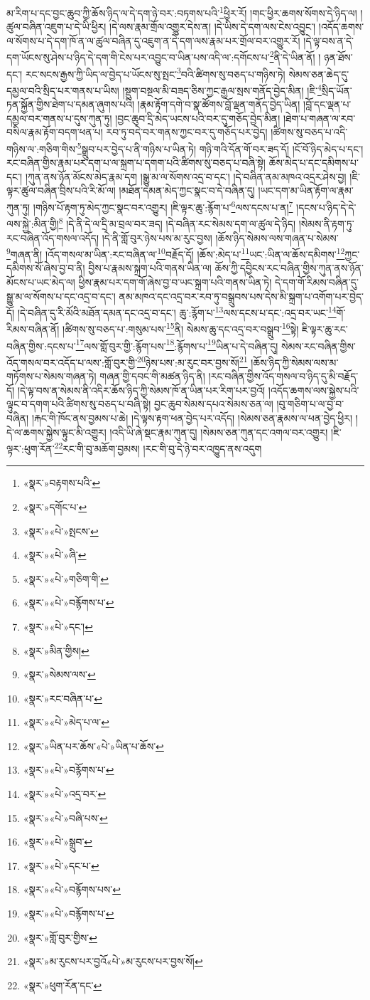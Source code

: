 མ་རིག་པ་དང་བྱང་ཆུབ་ཀྱི་ཆོས་ཉིད་ལ་དེ་དག་ཉེ་བར་:བཏགས་པའི་\footnote{«སྣར་»བརྟགས་པའི་}ཕྱིར་རོ། །གང་ཕྱིར་ཆགས་སོགས་དེ་ཉིད་ལ། །ཚུལ་བཞིན་འཇུག་པ་དེ་ཡི་ཕྱིར། །དེ་ལས་རྣམ་གྲོལ་འགྱུར་དེས་ན། །དེ་ཡིས་དེ་དག་ལས་ངེས་འབྱུང་། །འདོད་ཆགས་ལ་སོགས་པ་དེ་དག་ཁོ་ན་ལ་ཚུལ་བཞིན་དུ་འཇུག་ན་དེ་དག་ལས་རྣམ་པར་གྲོལ་བར་འགྱུར་རོ། །དེ་ལྟ་བས་ན་དེ་དག་ཡོངས་སུ་ཤེས་པ་ཉིད་དེ་དག་གི་ངེས་པར་འབྱུང་བ་ཡིན་པས་འདི་ལ་:དགོངས་པ་\footnote{«སྣར་»དགོང་པ་}ནི་དེ་ཡིན་ནོ། །
ཉན་ཐོས་དང་། རང་སངས་རྒྱས་ཀྱི་ཡིད་ལ་བྱེད་པ་ཡོངས་སུ་སྤང་\footnote{«སྣར་»«པེ་»སྤངས་}བའི་ཚིགས་སུ་བཅད་པ་གཉིས་ཏེ། སེམས་ཅན་ཆེད་དུ་དམྱལ་བའི་སྲིད་པར་གནས་པ་ཡིས། །སྡུག་བསྔལ་མི་བཟད་ཅིས་ཀྱང་རྒྱལ་སྲས་གནོད་བྱེད་མིན། །ཇི་\footnote{«སྣར་»«པེ་»ཞི་}སྲིད་ཡོན་ཏན་སྐྱོན་གྱིས་ཐེག་པ་དམན་ཞུགས་པའི། །རྣམ་རྟོག་དགེ་བ་སྣ་ཚོགས་བློ་ལྡན་གནོད་བྱེད་ཡིན། །བློ་དང་ལྡན་པ་དམྱལ་བར་གནས་པ་དུས་ཀུན་ཏུ། །བྱང་ཆུབ་དྲི་མེད་ཡངས་པའི་བར་དུ་གཅོད་བྱེད་མིན། །ཐེག་པ་གཞན་ལ་རབ་བསིལ་རྣམ་རྟོག་བདག་ཕན་པ། རབ་ཏུ་བདེ་བར་གནས་ཀྱང་བར་དུ་གཅོད་པར་བྱེད། །ཚིགས་སུ་བཅད་པ་འདི་གཉིས་ལ་:གཅིག་གིས་\footnote{«སྣར་»«པེ་»གཅིག་གི་}སྒྲུབ་པར་བྱེད་པ་ནི་གཉིས་པ་ཡིན་ཏེ། གཉི་གའི་དོན་གོ་བར་ཟད་དོ། །ངོ་བོ་ཉིད་མེད་པ་དང་། རང་བཞིན་གྱིས་རྣམ་པར་དག་པ་ལ་སྐྲག་པ་དགག་པའི་ཚིགས་སུ་བཅད་པ་བཞི་སྟེ། ཆོས་མེད་པ་དང་དམིགས་པ་དང་། །ཀུན་ནས་ཉོན་མོངས་མེད་རྣམ་དག །སྒྱུ་མ་ལ་སོགས་འདྲ་བ་དང་། །དེ་བཞིན་ནམ་མཁའ་འདྲར་ཤེས་བྱ། །ཇི་ལྟར་ཚུལ་བཞིན་བྲིས་པའི་རི་མོ་ལ། །མཐོན་དམན་མེད་ཀྱང་སྣང་བ་དེ་བཞིན་དུ། །ཡང་དག་མ་ཡིན་རྟོག་ལ་རྣམ་ཀུན་ཏུ། །གཉིས་པོ་རྟག་ཏུ་མེད་ཀྱང་སྣང་བར་འགྱུར། །ཇི་ལྟར་ཆུ་:རྙོག་པ་\footnote{«སྣར་»«པེ་»བརྙོགས་པ་}ལས་དངས་པ་ན།\footnote{«སྣར་»«པེ་»དང་།} །དངས་པ་ཉིད་དེ་དེ་ལས་སྐྱེ་:མིན་གྱི།\footnote{«སྣར་»མིན་གྱིས།} །དེ་ནི་དེ་ལ་དྲི་མ་བྲལ་བར་ཟད། །དེ་བཞིན་རང་སེམས་དག་ལ་ཚུལ་དེ་ཉིད། །སེམས་ནི་རྟག་ཏུ་རང་བཞིན་འོད་གསལ་འདོད། །དེ་ནི་གློ་བུར་ཉེས་པས་མ་རུང་བྱས། །ཆོས་ཉིད་སེམས་ལས་གཞན་པ་སེམས་\footnote{«སྣར་»སེམས་ལས་}གཞན་ནི། །འོད་གསལ་མ་ཡིན་:རང་བཞིན་ལ་\footnote{«སྣར་»རང་བཞིན་པ་}བརྗོད་དོ། །ཆོས་:མེད་པ་\footnote{«སྣར་»«པེ་»མེད་པ་ལ་}ཡང་:ཡིན་ལ་ཆོས་དམིགས་\footnote{«སྣར་»ཡིན་པར་ཆོས་«པེ་»ཡིན་པ་ཆོས་}ཀྱང་དམིགས་སོ་ཞེས་བྱ་བ་ནི། བྱིས་པ་རྣམས་སྐྲག་པའི་གནས་ཡིན་ལ། ཆོས་ཀྱི་དབྱིངས་རང་བཞིན་གྱིས་ཀུན་ནས་ཉོན་མོངས་པ་ཡང་མེད་ལ། ཕྱིས་རྣམ་པར་དག་གོ་ཞེས་བྱ་བ་ཡང་སྐྲག་པའི་གནས་ཡིན་ཏེ། དེ་དག་གོ་རིམས་བཞིན་དུ་སྒྱུ་མ་ལ་སོགས་པ་དང་འདྲ་བ་དང་། ནམ་མཁའ་དང་འདྲ་བར་རབ་ཏུ་བསྒྲུབས་པས་དེས་མི་སྐྲག་པ་འགོག་པར་བྱེད་དོ། །དེ་བཞིན་དུ་རི་མོའི་མཐོན་དམན་དང་འདྲ་བ་དང་། ཆུ་:རྙོག་པ་\footnote{«སྣར་»«པེ་»བརྙོགས་པ་}ལས་དངས་པ་དང་:འདྲ་བར་ཡང་\footnote{«སྣར་»«པེ་»འདྲ་བར་}གོ་རིམས་བཞིན་ནོ། །ཚིགས་སུ་བཅད་པ་:གསུམ་པས་\footnote{«སྣར་»«པེ་»བཞི་པས་}ནི། སེམས་ཆུ་དང་འདྲ་བར་བསྒྲུབ་\footnote{«སྣར་»«པེ་»སྒྲུབ་}སྟེ། ཇི་ལྟར་ཆུ་རང་བཞིན་གྱིས་:དངས་པ་\footnote{«སྣར་»«པེ་»དང་པ་}ལས་གློ་བུར་གྱི་:རྙོག་པས་\footnote{«སྣར་»«པེ་»བརྙོགས་པས་}:རྙོགས་པ་\footnote{«སྣར་»«པེ་»བརྙོགས་པ་}ཡིན་པ་དེ་བཞིན་དུ། སེམས་རང་བཞིན་གྱིས་འོད་གསལ་བར་འདོད་པ་ལས་:གློ་བུར་གྱི་\footnote{«སྣར་»གློ་བུར་གྱིས་}ཉེས་པས་:མ་རུང་བར་བྱས་སོ།\footnote{«སྣར་»མ་རུངས་པར་བྱའོ«པེ་»མ་རུངས་པར་བྱས་སོ།} །ཆོས་ཉིད་ཀྱི་སེམས་ལས་མ་གཏོགས་པ་སེམས་གཞན་ཏེ། གཞན་གྱི་དབང་གི་མཚན་ཉིད་ནི། །རང་བཞིན་གྱིས་འོད་གསལ་བ་ཉིད་དུ་མི་བརྗོད་དོ། །དེ་ལྟ་བས་ན་སེམས་ནི་འདིར་ཆོས་ཉིད་ཀྱི་སེམས་ཁོ་ན་ཡིན་པར་རིག་པར་བྱའོ། །འདོད་ཆགས་ལས་སྐྱེས་པའི་ལྟུང་བ་དགག་པའི་ཚིགས་སུ་བཅད་པ་བཞི་སྟེ། བྱང་ཆུབ་སེམས་དཔའ་སེམས་ཅན་ལ། །བུ་གཅིག་པ་ལ་བྱ་བ་བཞིན། །རྐང་གི་ཁོང་ནས་བྱམས་པ་ཆེ། །དེ་ལྟས་རྟག་ཕན་བྱེད་པར་འདོད། །སེམས་ཅན་རྣམས་ལ་ཕན་བྱེད་ཕྱིར། །དེ་ལ་ཆགས་སྐྱེས་ལྟུང་མི་འགྱུར། །འདི་ཡི་ཞེ་སྡང་རྣམ་ཀུན་དུ། །སེམས་ཅན་ཀུན་དང་འགལ་བར་འགྱུར། །ཇི་ལྟར་:ཕུག་རོན་\footnote{«སྣར་»ཕུག་རོན་དང་}རང་གི་བུ་མཆོག་བྱམས། །རང་གི་བུ་དེ་ཉེ་བར་འཁྱུད་ནས་འདུག 